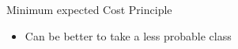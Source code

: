 \documentclass[11pt,compress,t,notes=noshow, xcolor=table]{beamer}
\begin{document}
\begin{frame}{Minimum expected Cost Principle}
\begin{itemize}
        
        \item Can be better to take a less probable class 

    \end{itemize}
\end{frame}
\end{document}
